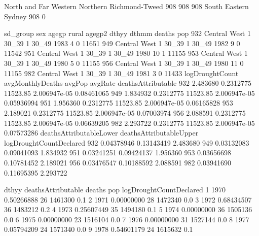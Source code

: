 \documentclass[a4paper]{article}                %
\begin{document}
\begin{Schunk}
\begin{Soutput}
North and Far Western              Northern        Richmond-Tweed 
                  908                   908                   908 
        South Eastern                Sydney 
                  908                     0 
\end{Soutput}
\begin{Soutput}
        sd_group sex agegp rural agegp2 dthyy dthmm deaths   pop
932 Central West   1 30_39     1  30_49  1983     4      0 11651
949 Central West   1 30_39     1  30_49  1982     9      0 11542
951 Central West   1 30_39     1  30_49  1980    10      1 11155
953 Central West   1 30_39     1  30_49  1980     5      0 11155
956 Central West   1 30_39     1  30_49  1980    11      0 11155
982 Central West   1 30_39     1  30_49  1981     3      0 11433
    logDroughtCount avgMonthlyDeaths   avgPop      avgRate deathsAttributable
932        2.483680        0.2312775 11523.85 2.006947e-05         0.08461065
949        1.834932        0.2312775 11523.85 2.006947e-05         0.05936994
951        1.956360        0.2312775 11523.85 2.006947e-05         0.06165828
953        2.189021        0.2312775 11523.85 2.006947e-05         0.07003974
956        2.088591        0.2312775 11523.85 2.006947e-05         0.06639205
982        2.293722        0.2312775 11523.85 2.006947e-05         0.07573286
    deathsAttributableLower deathsAttributableUpper logDroughtCountDeclared
932              0.04378946              0.13143419                2.483680
949              0.03132083              0.09041093                1.834932
951              0.03241251              0.09424137                1.956360
953              0.03656698              0.10781452                2.189021
956              0.03476547              0.10188592                2.088591
982              0.03941690              0.11695395                2.293722
\end{Soutput}
\begin{Soutput}
   dthyy deathsAttributable deaths     pop logDroughtCountDeclared
1   1970         0.50266888     26 1461300                     0.1
2   1971         0.00000000     28 1472340                     0.0
3   1972         0.68434507     36 1483212                     0.2
4   1973         0.25607449     35 1494180                     0.1
5   1974         0.00000000     36 1505136                     0.0
6   1975         0.00000000     23 1516104                     0.0
7   1976         0.00000000     31 1527144                     0.0
8   1977         0.05794209     24 1571340                     0.0
9   1978         0.54601179     24 1615632                     0.1

\end{Soutput}
\end{Schunk}
\end{document}
